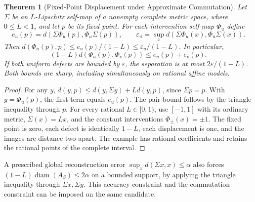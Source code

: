 \documentclass[11pt,a4paper]{article}
\newtheorem{theorem}{Theorem}[section]
\theoremstyle{definition}
\begin{document}
\begin{theorem}[Fixed-Point Displacement under Approximate Commutation]\label{thm:sigma-approximate-displacement}
Let $\Sigma$ be an $L$-Lipschitz self-map of a nonempty complete metric space, where $0\le L<1$, and let $p$ be its fixed point. For each intervention self-map $\Phi_u$ define
\[
 e_u(p)=d(\Sigma\Phi_u(p),\Phi_u\Sigma(p)),\qquad
 \varepsilon_u=\sup_x d(\Sigma\Phi_u(x),\Phi_u\Sigma(x)).
\]
Then $d(\Phi_u(p),p)\le e_u(p)/(1-L)\le\varepsilon_u/(1-L)$. In particular,
\[
 (1-L)d(\Phi_u(p),\Phi_v(p))\le e_u(p)+e_v(p).
\]
If both uniform defects are bounded by $\varepsilon$, the separation is at most $2\varepsilon/(1-L)$. Both bounds are sharp, including simultaneously on rational affine models.
\end{theorem}
\begin{proof}
For any $y$, $d(y,p)\le d(y,\Sigma y)+L d(y,p)$, since $\Sigma p=p$. With $y=\Phi_u(p)$, the first term equals $e_u(p)$. The pair bound follows by the triangle inequality through $p$. For every rational $L\in[0,1)$, use $[-1,1]$ with its ordinary metric, $\Sigma(x)=Lx$, and the constant interventions $\Phi_\pm(x)=\pm1$. The fixed point is zero, each defect is identically $1-L$, each displacement is one, and the images are distance two apart. The example has rational coefficients and retains the rational points of the complete interval.
\end{proof}

A prescribed global reconstruction error $\sup_x d(\Sigma x,x)\le\alpha$ also forces $(1-L)\operatorname{diam}(A_S)\le2\alpha$ on a bounded support, by applying the triangle inequality through $\Sigma x,\Sigma y$. This accuracy constraint and the commutation constraint can be imposed on the same candidate.
\end{document}
